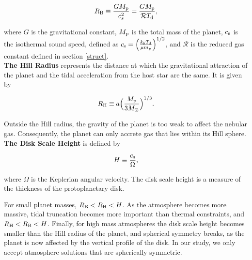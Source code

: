\documentclass[apj]{emulateapj}
\newcommand{\di}{_{\rm d}}
\begin{document}
\begin{equation}
\label{eq:RB}
R_{\rm B} \equiv \frac{G M_{\rm p}}{c_s^2}=\frac{G M_{\rm p}}{\mathcal{R} T\di},
\end{equation}

\noindent where $G$ is the gravitational constant, $M_{\rm p}$ is the total mass of the planet, $c_{\rm s}$ is the isothermal sound speed, defined as $c_{\rm s}=\Big(\frac{k_b T\di}{\mu m_p}\Big)^{1/2}$, and $\mathcal{R}$ is the reduced gas constant defined in section \ref{struct}.\\


\textbf{The Hill Radius} represents the distance at which the gravitational attraction of the planet and the tidal acceleration from the host star are the same. It is given by

\begin{equation}
\label{eq:RHill}
R_{\rm H} \equiv a \Big(\frac{M_{\rm p}}{3 M_{\odot}}\Big)^{1/3}.
\end{equation}

\noindent Outside the Hill radius, the gravity of the planet is too weak to affect the nebular gas. Consequently, the planet can only accrete gas that lies within its Hill sphere. \\

\textbf{The Disk Scale Height} is defined by

\begin{equation}
\label{eq:H}
H \equiv \frac{c_{\rm s}}{\Omega},
\end{equation}

\noindent where $\Omega$ is the Keplerian angular velocity. The disk scale height is a measure of the thickness of the protoplanetary disk. %


For small planet masses, $R_{\rm B}<R_{\rm H}<H$. As the atmosphere becomes more massive, tidal truncation becomes more important than thermal constraints, and $R_{\rm H}<R_{\rm B}<H$. Finally, for high mass atmospheres the disk scale height becomes smaller than the Hill radius of the planet, and spherical symmetry breaks, as the planet is now affected by the vertical profile of the disk. In our study, we only accept atmosphere solutions that are spherically symmetric.
\end{document}
